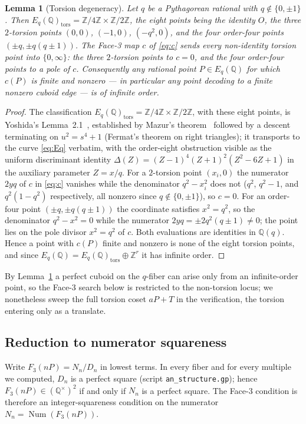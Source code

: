 \documentclass[11pt,reqno]{amsart}
\theoremstyle{plain}
\newtheorem{lemma}[theorem]{Lemma}
\theoremstyle{definition}
\newcommand{\Q}{\mathbb{Q}}
\newcommand{\Z}{\mathbb{Z}}
\DeclareMathOperator{\Num}{Num}
\begin{document}
\begin{lemma}[Torsion degeneracy]\label{lem:tors-deg}
Let $q$ be a Pythagorean rational with $q\notin\{0,\pm1\}$. Then
$E_q(\Q)_{\mathrm{tors}}=\Z/4\Z\times\Z/2\Z$, the eight points being the identity
$O$, the three $2$-torsion points $(0,0)$, $(-1,0)$, $(-q^2,0)$, and the four
order-four points $(\pm q,\pm q(q\pm1))$. The Face-3 map $c$ of \eqref{eq:c}
sends every non-identity torsion point into $\{0,\infty\}$: the three $2$-torsion
points to $c=0$, and the four order-four points to a pole of $c$. Consequently
any rational point $P\in E_q(\Q)$ for which $c(P)$ is finite and nonzero --- in
particular any point decoding to a finite nonzero cuboid edge --- is of infinite
order.
\end{lemma}

\begin{proof}
The classification $E_q(\Q)_{\mathrm{tors}}=\Z/4\Z\times\Z/2\Z$, with these eight
points, is Yoshida's Lemma~2.1~\cite[op.\ cit.]{yoshida}, established by Mazur's
theorem~\cite{mazur} followed by a descent terminating on $u^2=s^4+1$ (Fermat's
theorem on right triangles); it transports to the curve \eqref{eq:Eq} verbatim,
with the order-eight obstruction visible as the uniform discriminant identity
$\Delta(Z)=(Z-1)^4(Z+1)^2(Z^2-6Z+1)$ in the auxiliary parameter $Z=x/q$. For a
$2$-torsion point $(x_i,0)$ the numerator $2yq$ of $c$ in \eqref{eq:c} vanishes
while the denominator $q^2-x_i^2$ does not ($q^2$, $q^2-1$, and $q^2(1-q^2)$
respectively, all nonzero since $q\notin\{0,\pm1\}$), so $c=0$. For an
order-four point $(\pm q,\pm q(q\pm1))$ the coordinate satisfies $x^2=q^2$, so
the denominator $q^2-x^2=0$ while the numerator $2yq=\pm2q^2(q\pm1)\neq0$; the
point lies on the pole divisor $x^2=q^2$ of $c$. Both evaluations are identities
in $\Q(q)$. Hence a point with $c(P)$ finite and nonzero is none of the eight
torsion points, and since $E_q(\Q)=E_q(\Q)_{\mathrm{tors}}\oplus\Z^r$ it has
infinite order.
\end{proof}

By Lemma~\ref{lem:tors-deg} a perfect cuboid on the $q$-fiber can arise only from
an infinite-order point, so the Face-3 search below is restricted to the
non-torsion locus; we nonetheless sweep the full torsion coset $aP+T$ in the
verification, the torsion entering only as a translate.

\subsection{Reduction to numerator squareness}
Write $F_3(nP)=N_n/D_n$ in lowest terms. In every fiber and for every multiple
we computed, $D_n$ is a perfect square (script \texttt{an\_structure.gp}); hence
$F_3(nP)\in(\Q^\times)^2$ if and only if $N_n$ is a perfect square. The Face-3
condition is therefore an integer-squareness condition on the numerator
$N_n=\Num(F_3(nP))$.
\end{document}
